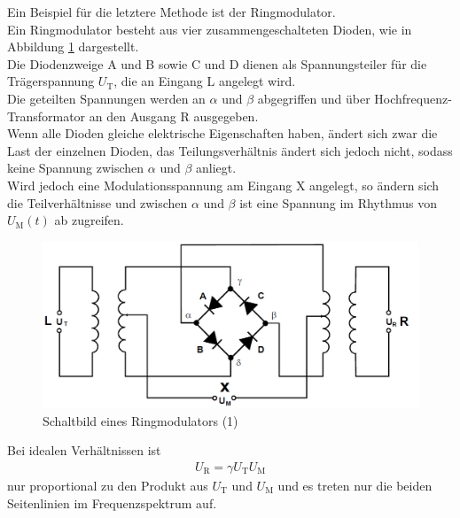 \documentclass[]{scrartcl}
\begin{document}
Ein Beispiel für die letztere Methode ist der Ringmodulator.\\
Ein Ringmodulator besteht aus vier zusammengeschalteten Dioden, wie in Abbildung \ref{fig:ringmodulator} dargestellt.\\
Die Diodenzweige A und B sowie C und D dienen als Spannungsteiler für die Trägerspannung $U_{\text{T}}$, die an Eingang L angelegt wird.\\
Die geteilten Spannungen werden an $\alpha$ und $\beta$ abgegriffen und über Hochfrequenz-Transformator an den Ausgang R ausgegeben.\\
Wenn alle Dioden gleiche elektrische Eigenschaften haben, ändert sich zwar die Last der einzelnen Dioden, das Teilungsverhältnis ändert sich jedoch nicht, sodass keine Spannung zwischen $\alpha$ und $\beta$ anliegt.\\
Wird jedoch eine Modulationsspannung am Eingang X angelegt, so ändern sich die Teilverhältnisse und zwischen $\alpha$ und $\beta$ ist eine Spannung im Rhythmus von $U_{\text{M}}\left(t\right)$ ab zugreifen.\\
\begin{figure}[H]
\centering 
\includegraphics[width=13cm]{images/ringmodulatorschaltung.png}
\caption{Schaltbild eines Ringmodulators (1)}
\label{fig:ringmodulator}
\end{figure} 
Bei idealen Verhältnissen ist
\begin{align}
U_{\text{R}}=\gamma U_{\text{T}}U_{\text{M}}\label{eq:ringmodulatorprodukt}
\end{align}
nur proportional zu den Produkt aus $U_{\text{T}}$ und $U_{\text{M}}$ und es treten nur die beiden Seitenlinien im Frequenzspektrum auf.
\end{document}
